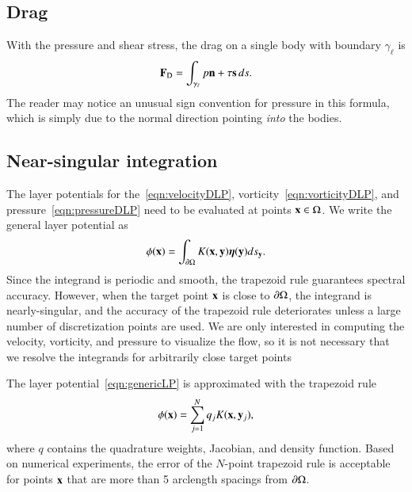 \documentclass[preprint, 10pt]{elsarticle}
\begin{document}
\subsection{Drag}
\label{sec:drag}
With the pressure and shear stress, the drag on a single body with
boundary $\gamma_\ell$ is
\begin{align}
  \mathbf{F}_{\text{D}} = \int_{\gamma_\ell} p {\mathbf{n}} + \tau {\mathbf{s}} \,ds.
  \label{eqn:drag}
\end{align}
The reader may notice an unusual sign convention for pressure in this formula, which is simply due to the normal direction pointing {\em into} the bodies.

\subsection{Near-singular integration}
\label{sec:NSI}
The layer potentials for the~\eqref{eqn:velocityDLP},
vorticity~\eqref{eqn:vorticityDLP}, and pressure~\eqref{eqn:pressureDLP}
need to be evaluated at points ${\mathbf{x}} \in \Omega$. We write the general
layer potential as
\begin{align}
  \phi({\mathbf{x}}) = \int_{{\partial}\Omega} K({\mathbf{x}},{\mathbf{y}}) {\boldsymbol\eta}({\mathbf{y}}) ds_{\mathbf{y}}.
  \label{eqn:genericLP}
\end{align}
Since the integrand is periodic and smooth, the trapezoid rule
guarantees spectral accuracy.  However, when the target point ${\mathbf{x}}$ is
close to ${\partial}\Omega$, the integrand is nearly-singular, and the accuracy
of the trapezoid rule deteriorates unless a large number of
discretization points are used.  We are only interested in computing the
velocity, vorticity, and pressure to visualize the flow, so it is not
necessary that we resolve the integrands for arbitrarily close target
points

The layer potential~\eqref{eqn:genericLP} is approximated with the
trapezoid rule 
\begin{align}
  \phi({\mathbf{x}}) = \sum_{j=1}^N q_j K({\mathbf{x}},{\mathbf{y}}_j),
  \label{eqn:layerPotential}
\end{align}
where $q$ contains the quadrature weights, Jacobian, and density
function.  Based on numerical experiments, the error of the $N$-point
trapezoid rule is acceptable for points ${\mathbf{x}}$ that are more than 5
arclength spacings from ${\partial}\Omega$.
\end{document}
